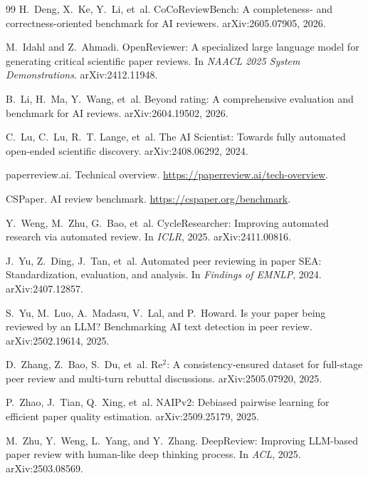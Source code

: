 \documentclass[11pt,a4paper]{article}
\begin{document}
\begin{thebibliography}{99}\small
{}
H.~Deng, X.~Ke, Y.~Li, et~al.
\newblock CoCoReviewBench: A completeness- and correctness-oriented benchmark for AI reviewers.
\newblock arXiv:2605.07905, 2026.

M.~Idahl and Z.~Ahmadi.
\newblock OpenReviewer: A specialized large language model for generating critical scientific
paper reviews.
\newblock In \emph{NAACL 2025 System Demonstrations}. arXiv:2412.11948.

B.~Li, H.~Ma, Y.~Wang, et~al.
\newblock Beyond rating: A comprehensive evaluation and benchmark for AI reviews.
\newblock arXiv:2604.19502, 2026.

C.~Lu, C.~Lu, R.~T. Lange, et~al.
\newblock The AI Scientist: Towards fully automated open-ended scientific discovery.
\newblock arXiv:2408.06292, 2024.

paperreview.ai.
\newblock Technical overview.
\newblock \url{https://paperreview.ai/tech-overview}.

CSPaper.
\newblock AI review benchmark.
\newblock \url{https://cspaper.org/benchmark}.

Y.~Weng, M.~Zhu, G.~Bao, et~al.
\newblock CycleResearcher: Improving automated research via automated review.
\newblock In \emph{ICLR}, 2025. arXiv:2411.00816.

J.~Yu, Z.~Ding, J.~Tan, et~al.
\newblock Automated peer reviewing in paper SEA: Standardization, evaluation, and analysis.
\newblock In \emph{Findings of EMNLP}, 2024. arXiv:2407.12857.

S.~Yu, M.~Luo, A.~Madasu, V.~Lal, and P.~Howard.
\newblock Is your paper being reviewed by an LLM? Benchmarking AI text detection in peer review.
\newblock arXiv:2502.19614, 2025.

D.~Zhang, Z.~Bao, S.~Du, et~al.
\newblock Re$^2$: A consistency-ensured dataset for full-stage peer review and multi-turn rebuttal
discussions.
\newblock arXiv:2505.07920, 2025.

P.~Zhao, J.~Tian, Q.~Xing, et~al.
\newblock NAIPv2: Debiased pairwise learning for efficient paper quality estimation.
\newblock arXiv:2509.25179, 2025.

M.~Zhu, Y.~Weng, L.~Yang, and Y.~Zhang.
\newblock DeepReview: Improving LLM-based paper review with human-like deep thinking process.
\newblock In \emph{ACL}, 2025. arXiv:2503.08569.
\end{thebibliography}
\end{document}
